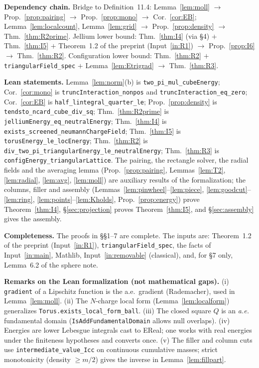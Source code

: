 \documentclass[11pt]{article}
\theoremstyle{definition}
\theoremstyle{remark}
\begin{document}
\textbf{Dependency chain.}
Bridge to Definition~11.4: Lemma~\ref{lem:moll} $\to$ Prop.~\ref{prop:pairing} $\to$ Prop.~\ref{prop:mono} $\to$ Cor.~\ref{cor:EB}; Lemma~\ref{lem:localcount}, Lemma~\ref{lem:grid} $\to$
Prop.~\ref{prop:density} $\to$ Thm.~\ref{thm:R2prime}.
Jellium lower bound: Thm.~\ref{thm:I4} (via \S4) $+$ Thm.~\ref{thm:I5} $+$ Theorem~1.2 of the preprint (Input~\ref{in:R1}) $\to$ Prop.~\ref{prop:I6} $\to$ Thm.~\ref{thm:R2}.
Configuration lower bound: Thm.~\ref{thm:R2} $+$ \texttt{triangularField\_spec} $+$ Lemma~\ref{lem:Etrigrad} $\to$ Thm.~\ref{thm:R3}.

\textbf{Lean statements.} Lemma~\ref{lem:norm}(b) is \texttt{two\_pi\_mul\_cubeEnergy}; Cor.~\ref{cor:mono} is
\texttt{truncInteraction\_nonpos} and \texttt{truncInteraction\_eq\_zero}; Cor.~\ref{cor:EB} is \texttt{half\_lintegral\_quarter\_le};
Prop.~\ref{prop:density} is \texttt{tendsto\_ncard\_cube\_div\_sq}; Thm.~\ref{thm:R2prime} is \texttt{jelliumEnergy\_eq\_neutralEnergy};
Thm.~\ref{thm:I4} is \texttt{exists\_screened\_neumannChargeField}; Thm.~\ref{thm:I5} is \texttt{torusEnergy\_le\_locEnergy};
Thm.~\ref{thm:R2} is \texttt{div\_two\_pi\_triangularEnergy\_le\_neutralEnergy}; Thm.~\ref{thm:R3} is \texttt{configEnergy\_triangularLattice}.
The pairing, the rectangle solver, the radial fields and the averaging lemma (Prop.~\ref{prop:pairing}, Lemmas~\ref{lem:T2}, \ref{lem:radial}, \ref{lem:avg}, \ref{lem:moll}) are
auxiliary results of the formalization; the columns, filler and assembly (Lemmas~\ref{lem:pinwheel}--\ref{lem:piece},
\ref{lem:goodcut}--\ref{lem:ring}, \ref{lem:points}--\ref{lem:Kholds}, Prop.~\ref{prop:energy}) prove Theorem~\ref{thm:I4}, \S\ref{sec:projection} proves Theorem~\ref{thm:I5},
and \S\ref{sec:assembly} gives the assembly.

\textbf{Completeness.} The proofs in \S\S1--7 are complete. The inputs are: Theorem~1.2 of the preprint (Input~\ref{in:R1}), \texttt{triangularField\_spec}, the facts of
Input~\ref{in:main}, Mathlib, Input~\ref{in:removable} (classical), and, for \S7 only, Lemma~6.2 of the sphere note.

\textbf{Remarks on the Lean formalization (not mathematical gaps).} (i) \texttt{gradient} of a Lipschitz function is the a.e.\ gradient (Rademacher), used in Lemma~\ref{lem:moll}.
(ii) The $N$-charge local form (Lemma~\ref{lem:localform}) generalizes \texttt{Torus.exists\_local\_form\_ball}. (iii) The closed square $Q$ is an \emph{a.e.} fundamental domain
(\texttt{IsAddFundamentalDomain} allows null overlaps). (iv) Energies are lower Lebesgue integrals cast to EReal; one works with real energies under the finiteness hypotheses and
converts once. (v) The filler and column cuts use \texttt{intermediate\_value\_Icc} on continuous cumulative masses; strict monotonicity
(density $\ge m/2$) gives the inverse in Lemma~\ref{lem:fillpart}.
\end{document}
